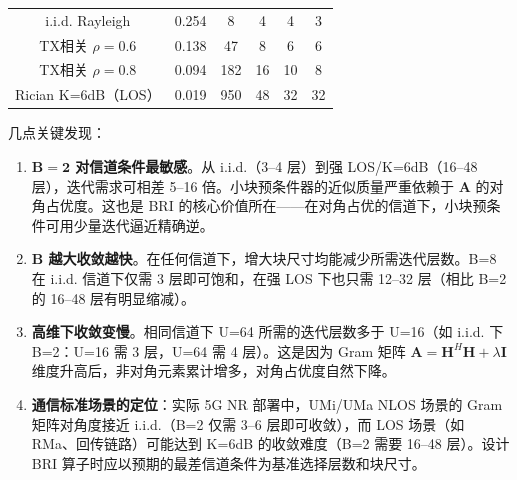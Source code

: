 \begin{table}[H]
\begin{tabular}{c|c|c|c|c|c}
            \midrule i.i.d. Rayleigh                                               & 0.254          & 8                     & 4            & 4            & 3            \\
            TX相关 $\rho=0.6$                                                        & 0.138          & 47                    & 8            & 6            & 6            \\
            TX相关 $\rho=0.8$                                                        & 0.094          & 182                   & 16           & 10           & 8            \\
            Rician K=6dB（LOS）                                                      & 0.019          & 950                   & 48           & 32           & 32           \\
            \bottomrule
        \end{tabular}
    \end{table}

    几点关键发现：

    \begin{enumerate}
        \item \textbf{$\bm{B=2}$ 对信道条件最敏感}。从 i.i.d.（3--4 层）到强 LOS/K=6dB（16--48
            层），迭代需求可相差 5--16 倍。小块预条件器的近似质量严重依赖于
            $\bm{A}$ 的对角占优度。这也是 BRI
            的核心价值所在——在对角占优的信道下，小块预条件可用少量迭代逼近精确逆。

        \item \textbf{$\bm{B}$ 越大收敛越快}。在任何信道下，增大块尺寸均能减少所需迭代层数。B=8
            在 i.i.d. 信道下仅需 3 层即可饱和，在强 LOS 下也只需 12--32 层（相比
            B=2 的 16--48 层有明显缩减）。

        \item \textbf{高维下收敛变慢}。相同信道下 U=64 所需的迭代层数多于 U=16（如
            i.i.d. 下 B=2：U=16 需 3 层，U=64 需 4 层）。这是因为 Gram 矩阵
            $\bm{A}=\bm{H}^{H}\bm{H}+\lambda\bm{I}$
            维度升高后，非对角元素累计增多，对角占优度自然下降。

        \item \textbf{通信标准场景的定位}：实际 5G NR 部署中，UMi/UMa NLOS 场景的
            Gram 矩阵对角度接近 i.i.d.（B=2 仅需 3--6 层即可收敛），而 LOS
            场景（如 RMa、回传链路）可能达到 K=6dB 的收敛难度（B=2 需要 16--48 层）。设计
            BRI 算子时应以预期的最差信道条件为基准选择层数和块尺寸。
    \end{enumerate}


